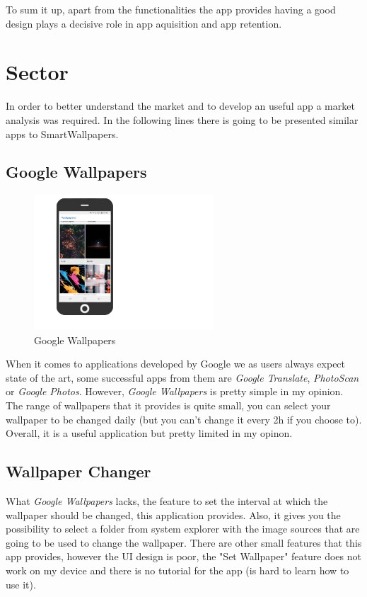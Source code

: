 \documentclass[version=last,fontsize=13pt]{scrartcl}
\begin{document}
	To sum it up, apart from the functionalities the app provides having a good design plays a decisive role in app aquisition and app retention.

\section{Sector}
	
	In order to better understand the market and to develop an useful app a market analysis was required. In the following lines there is going to be presented similar apps to SmartWallpapers.

\subsection{Google Wallpapers}
		
		\begin{figure}
	
			\centering
			\includegraphics[width=0.6\textwidth]{imgs/Google_Wallpapers.png}
			\caption*{Google Wallpapers}

		\end{figure}

		When it comes to applications developed by Google we as users always expect state of the art, some successful apps from them are \textit{Google Translate}, \textit{PhotoScan} or \textit{Google Photos}. However, \textit{Google Wallpapers} is pretty simple in my opinion. The range of wallpapers that it provides is quite small, you can select your wallpaper to be changed daily (but you can't change it every 2h if you choose to). Overall, it is a useful application but pretty limited in my opinon.


		\subsection{Wallpaper Changer}
		What \textit{Google Wallpapers} lacks, the feature to set the interval at which the wallpaper should be changed, this application provides.
Also, it gives you the possibility to select a folder from system explorer with the image sources that are going to be used to change the wallpaper. There are other small features that this app provides, however the UI design is poor, the "Set Wallpaper"  feature does not work on my device and there is no tutorial for the app (is hard to learn how to use it).\\
\end{document}

